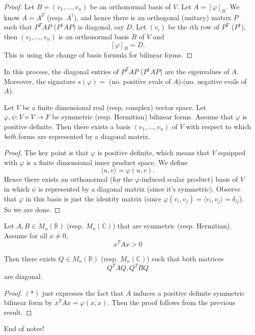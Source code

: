 \documentclass[egregdoesnotlikesansseriftitles,a4paper]{scrartcl}
\begin{document}
\begin{proof}
      Let $B=(v_1,\ldots ,v_n)$ be an orthonormal basis of $V$. Let $A=[\varphi]_B$. We know $A=A^T$ (resp. $A^\dagger$), and hence there is an orthogonal (unitary) matrix $P$ such that $P^TAP$ ($P^\dagger AP$) is diagonal, say $D$. Let $(v_i)$ be the $i$th row of $P^T$ ($P^\dagger$), then $(v_1,\ldots , v_n)$ is an orthonormal basis $B$ of $V$ and 
      \[[\varphi]_B=D.\]
      This is using the change of basis formula for bilinear forms.
\end{proof}

\begin{remark}
      In this process, the diagonal entries of $P^TAP$ ($P^\dagger AP$) are the eigenvalues of $A$. Moreover, the signature $s (\varphi)=$ (no. positive evals of $A$)-(no. negative evals of $A$).
\end{remark}

\begin{corollary}
     Let $V$ be a finite dimensional real (resp. complex) vector space. Let $\varphi, \psi : V \times V \rightarrow F$ be symmetric (resp. Hermitian) bilinear forms. Assume that $\varphi$ is positive definite. Then there exists a basis $(v_1, \ldots ,v_n)$ of $V$ with respect to which \emph{both} forms are represented by a diagonal matrix. 
\end{corollary}
\begin{proof}
     The key point is that $\varphi$ is positive definite, which means that $V$ equipped with $\varphi$ is a finite dimensional inner product space. We define 
     \[\langle u,v \rangle =\varphi (u,v).\]
     Hence there exists an orthonormal (for the $\varphi$-induced scalar product) basis of $V$ in which $\psi$ is represented by a diagonal matrix (since it's symmetric). Observe that $\varphi$ in this basis is just the identity matrix (since $\varphi (v_i,v_j)=\langle v_i,v_j \rangle= \delta_{ij}$). So we are done.
\end{proof}
\begin{corollary}
     Let $A,B \in M_n (\mathbb{R})$ (resp. $M_n (\mathbb{C})$) that are symmetric (resp. Hermitian). Assume for all $x \neq 0$, 
     \begin{equation}
          \overline{x} ^TAx>0 \tag{$\ast$}
     \end{equation}
     
      Then there exists $Q \in M_n (\mathbb{R})$ (resp. $M_n (\mathbb{C})$) such that both matrices 
     \[Q^TAQ, Q^TBQ\]
     are diagonal.
\end{corollary}
\begin{proof}
      $(\ast)$ just expresses the fact that $A$ induces a positive definite symmetric bilinear form by $\overline{x} ^T Ax=\varphi (x,x)$. Then the proof follows from the previous result.
\end{proof}

\begin{remark}
      End of notes!
\end{remark}
\end{document}
